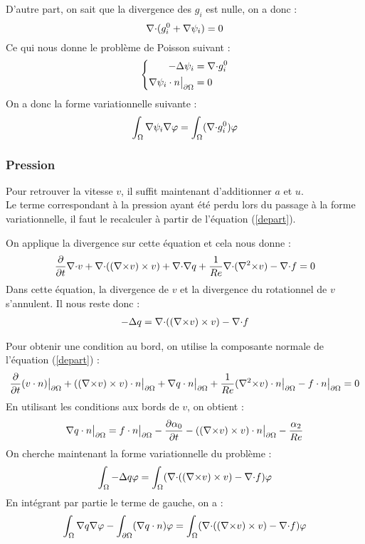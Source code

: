 D'autre part, on sait que la divergence des $g_i$ est nulle, on a donc :
\[
{\nabla\cdot} (g_i^0+{\nabla}\psi_i)=0
\]
Ce qui nous donne le problème de Poisson suivant :
\begin{eqnarray}
\label{psi}
\left\{
\begin{aligned}
-{\Delta}\psi_i &= {\nabla\cdot} g_i^0\\
{\nabla}\psi_i\cdot n{\big\rvert_{\partial\Omega}} &= 0
\end{aligned}
\right.
\end{eqnarray}
On a donc la forme variationnelle suivante :
\begin{eqnarray}
\label{fvpsii}
\int_\Omega {\nabla}\psi_i{\nabla}\varphi = \int_\Omega ({\nabla\cdot} g_i^0)\varphi
\end{eqnarray}

\subsubsection{Pression}
\label{pression}

Pour retrouver la vitesse $v$, il suffit maintenant d'additionner $a$ et $u$.\\
Le terme correspondant à la pression ayant été perdu lors du passage à la forme variationnelle, il faut le recalculer à partir de l'équation (\ref{depart}).

On applique la divergence sur cette équation et cela nous donne :
\[
\frac{\partial}{\partial t}{\nabla\cdot} v + {\nabla\cdot}(({\nabla\times} v)\times v) + {\nabla\cdot}{\nabla} q + \frac{1}{Re}{\nabla\cdot}({\nabla^2\times} v) - {\nabla\cdot} f = 0
\]
Dans cette équation, la divergence de $v$ et la divergence du rotationnel de $v$ s'annulent. Il nous reste donc :
\begin{eqnarray}
\label{q}
-{\Delta} q = {\nabla\cdot}(({\nabla\times} v)\times v) - {\nabla\cdot} f
\end{eqnarray}

Pour obtenir une condition au bord, on utilise la composante normale de l'équation (\ref{depart}) :
\[
\frac{\partial}{\partial t}(v\cdot n){\big\rvert_{\partial\Omega}} + (({\nabla\times} v)\times v)\cdot n{\big\rvert_{\partial\Omega}} + {\nabla} q\cdot n{\big\rvert_{\partial\Omega}} +\frac{1}{Re}({\nabla^2\times} v)\cdot n{\big\rvert_{\partial\Omega}} - f\cdot n{\big\rvert_{\partial\Omega}} = 0
\]
En utilisant les conditions aux bords de $v$, on obtient :
\[
{\nabla} q\cdot n{\big\rvert_{\partial\Omega}} =  f\cdot n{\big\rvert_{\partial\Omega}} - \frac{\partial\alpha_0}{\partial t} - (({\nabla\times} v)\times v)\cdot n{\big\rvert_{\partial\Omega}} - \frac{\alpha_2}{Re}
\]
On cherche maintenant la forme variationnelle du problème :
\[
\int_\Omega -{\Delta} q\varphi = \int_\Omega ({\nabla\cdot}(({\nabla\times} v)\times v) -{\nabla\cdot} f)\varphi
\]
En intégrant par partie le terme de gauche, on a :
\[
\int_\Omega {\nabla} q{\nabla}\varphi - \int_{\partial\Omega} ({\nabla} q\cdot n)\varphi = \int_\Omega ({\nabla\cdot}(({\nabla\times} v)\times v) -{\nabla\cdot} f)\varphi
\]

